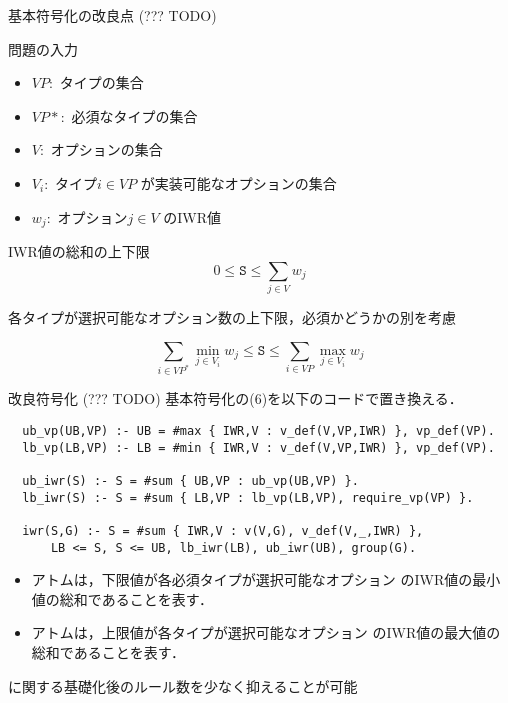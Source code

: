 \documentclass[dvipdfmx, 11pt]{beamer}
\begin{document}
\begin{frame}{基本符号化の改良点 (\alert{??? TODO})}
 \begin{block}{問題の入力}
  \begin{itemize}
   \item $VP$:\ タイプの集合
   \item $VP*$:\ 必須なタイプの集合
   \item $V$:\ オプションの集合
   \item $V_i$:\ タイプ$i \in VP$ が実装可能なオプションの集合
   \item $w_j$:\ オプション$j \in V$ のIWR値
  \end{itemize}
 \end{block}
 \begin{block}{IWR値の総和の上下限}
  \[
   0 \leq \texttt{S} \leq \sum_{j\in V}w_{j}
  \]
 \end{block}
 \alert{各タイプが選択可能なオプション数の上下限，必須かどうかの別を考慮}
 \begin{alertblock}{}
  \[
   \sum_{i\in VP^{*}}\min_{j\in V_{i}}w_{j}
   \leq \texttt{S} \leq
   \sum_{i\in VP}\max_{j\in V_{i}}w_{j}
  \]
 \end{alertblock}
\end{frame}
\begin{frame}[fragile]{改良符号化  (\alert{??? TODO})}
 基本符号化の(6)を以下のコードで置き換える．
\begin{exampleblock}{}
 \footnotesize
 \begin{lstlisting}
  ub_vp(UB,VP) :- UB = #max { IWR,V : v_def(V,VP,IWR) }, vp_def(VP).
  lb_vp(LB,VP) :- LB = #min { IWR,V : v_def(V,VP,IWR) }, vp_def(VP).

  ub_iwr(S) :- S = #sum { UB,VP : ub_vp(UB,VP) }.
  lb_iwr(S) :- S = #sum { LB,VP : lb_vp(LB,VP), require_vp(VP) }.

  iwr(S,G) :- S = #sum { IWR,V : v(V,G), v_def(V,_,IWR) },
      LB <= S, S <= UB, lb_iwr(LB), ub_iwr(UB), group(G).
 \end{lstlisting}
\end{exampleblock}
 \begin{itemize}
  \item アトムは，下限値が各必須タイプが選択可能なオプション
	のIWR値の最小値の総和であることを表す．
  \item アトムは，上限値が各タイプが選択可能なオプション
	のIWR値の最大値の総和であることを表す．
 \end{itemize}
 \begin{block}{}
  に関する基礎化後のルール数を少なく抑えることが可能
 \end{block}
\end{frame}
\end{document}
